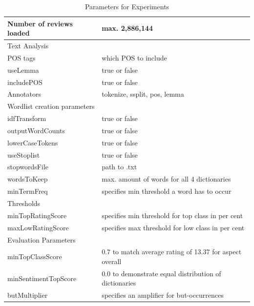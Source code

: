 \documentclass[11pt,titlepage,oneside,openany]{book}
\begin{document}
\begin{table}[h]
\label{tab:Parameters for Testing}
\begin{center}

\begin{tabular}{|l|l|}
\hline
Number of reviews loaded           & max. 2,886,144           \\ \hline
Text Analysis          &      \\ \hline
POS tags                   & which POS to include               \\ \hline
useLemma                  & true or false          \\ \hline
includePOS                  & true or false          \\ \hline
Annotators     & tokenize, ssplit, pos, lemma                  \\ \hline
Wordlist creation parameters     &                \\ \hline
idfTransform                           & true or false \\ \hline
outputWordCounts                            & true or false\\ \hline
lowerCaseTokens                   & true or false \\ \hline
useStoplist                & true or false \\ \hline
stopwordsFile                     & path to .txt \\ \hline
wordsToKeep                     & max. amount of words for all 4 dictionaries \\ \hline
minTermFreq                    & specifies min threshold a word has to occur \\ \hline
Thresholds                   &  \\ \hline
minTopRatingScore                  & specifies min threshold for top class in per cent \\ \hline
maxLowRatingScore                  & specifies max threshold for low class in per cent \\ \hline
Evaluation Parameters                   &  \\ \hline
minTopClassScore                  & 0.7 to match average rating of 13.37 for aspect overall \\ \hline
minSentimentTopScore                  & 0.0 to demonstrate equal distribution of dictionaries\\ \hline
butMultiplier                 & specifies an amplifier for but-occurrences \\ \hline
\end{tabular}
\caption{Parameters for Experiments}
\end{center}

\end{table}
\end{document}

